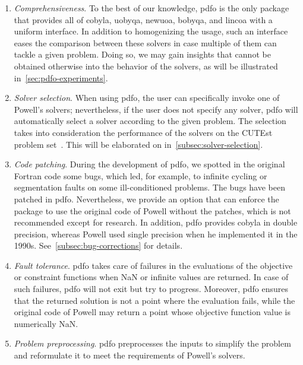 \begin{enumerate}
    \item \emph{Comprehensiveness}.
    To the best of our knowledge, \gls{pdfo} is the only package that provides all of \gls{cobyla}, \gls{uobyqa}, \gls{newuoa}, \gls{bobyqa}, and \gls{lincoa} with a uniform interface.
    In addition to homogenizing the usage, such an interface eases the comparison between these solvers in case multiple of them can tackle a given problem.
    Doing so, we may gain insights that cannot be obtained otherwise into the behavior of the solvers, as will be illustrated in~\cref{sec:pdfo-experiments}.
    \item \emph{Solver selection}.
    When using \gls{pdfo}, the user can specifically invoke one of Powell's solvers; nevertheless, if the user does not specify any solver, \gls{pdfo} will automatically select a solver according to the given problem.
    The selection takes into consideration the performance of the solvers on the CUTEst problem set~\cite{Gould_Orban_Toint_2015}.
    This will be elaborated on in~\cref{subsec:solver-selection}.
    \item \emph{Code patching}.
    During the development of \gls{pdfo}, we spotted in the original Fortran code some bugs, which led, for example, to infinite cycling or segmentation faults on some ill-conditioned problems.
    The bugs have been patched in \gls{pdfo}.
    Nevertheless, we provide an option that can enforce the package to use the original code of Powell without the patches, which is not recommended except for research.
    In addition, \gls{pdfo} provides \gls{cobyla} in double precision, whereas Powell used single precision when he implemented it in the 1990s.
    See~\cref{subsec:bug-corrections} for details.
    \item \emph{Fault tolerance}.
    \Gls{pdfo} takes care of failures in the evaluations of the objective or constraint functions when NaN or infinite values are returned.
    In case of such failures, \gls{pdfo} will not exit but try to progress.
    Moreover, \gls{pdfo} ensures that the returned solution is not a point where the evaluation fails, while the original code of Powell may return a point whose objective function value is numerically NaN.
    \item \emph{Problem preprocessing}.
    \gls{pdfo} preprocesses the inputs to simplify the problem and reformulate it to meet the requirements of Powell's solvers.

\end{enumerate}

